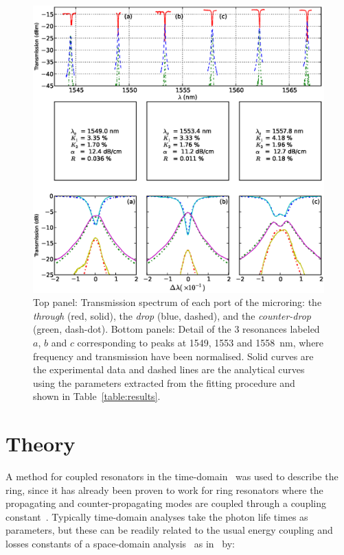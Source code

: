 \documentclass[10pt,letterpaper]{article}
\begin{document}
\begin{figure}[!t]
    \centering
    \includegraphics[width=1.0\textwidth]{image.eps}
    \caption{Top panel: Transmission spectrum of each port of the microring: the \emph{through} (red, solid), the \emph{drop} (blue, dashed), and the \emph{counter-drop} (green, dash-dot). Bottom panels: Detail of the 3 resonances labeled $a$, $b$ and $c$ corresponding to peaks at 1549, 1553 and 1558~nm, where frequency and transmission have been normalised. Solid curves are the experimental data and dashed lines are the analytical curves using the parameters extracted from the fitting procedure and shown in Table~\ref{table:results}.}

    \label{fig:espectro}

\end{figure}


\section{Theory}
\label{sec:theory}

A method for coupled resonators in the time-domain~\cite{Haus1984} was used to describe the ring, since it has already been proven to work for ring resonators where the propagating and counter-propagating modes are coupled through a coupling constant~\cite{Zhang2008}.
Typically time-domain analyses take the photon life times as parameters, but these can be readily related to the usual energy coupling and losses constants of a space-domain analysis~\cite{J.HeebnerR.Grover2008} as in~\cite{Little1997} by:
\end{document}
